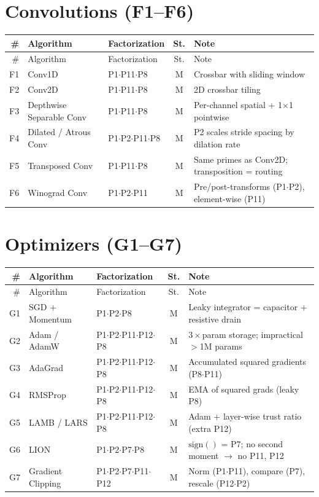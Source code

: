\documentclass[10pt]{article}
\begin{document}
\section{Convolutions (F1--F6)}

\begin{longtable}{rlp{3.0cm}cp{4.8cm}}
\toprule
\# & Algorithm & Factorization & St. & Note \\
\midrule
\endfirsthead
\toprule
\# & Algorithm & Factorization & St. & Note \\
\midrule
\endhead
\bottomrule
\endfoot
F1 & Conv1D & P1$\cdot$P11$\cdot$P8 & M & Crossbar with sliding window \\
F2 & Conv2D & P1$\cdot$P11$\cdot$P8 & M & 2D crossbar tiling \\
F3 & Depthwise Separable Conv & P1$\cdot$P11$\cdot$P8 & M & Per-channel spatial + 1$\times$1 pointwise \\
F4 & Dilated / Atrous Conv & P1$\cdot$P2$\cdot$P11$\cdot$P8 & M & P2 scales stride spacing by dilation rate \\
F5 & Transposed Conv & P1$\cdot$P11$\cdot$P8 & M & Same primes as Conv2D; transposition = routing \\
F6 & Winograd Conv & P1$\cdot$P2$\cdot$P11 & M & Pre/post-transforms (P1$\cdot$P2), element-wise (P11) \\
\end{longtable}

\section{Optimizers (G1--G7)}

\begin{longtable}{rlp{3.0cm}cp{4.8cm}}
\toprule
\# & Algorithm & Factorization & St. & Note \\
\midrule
\endfirsthead
\toprule
\# & Algorithm & Factorization & St. & Note \\
\midrule
\endhead
\bottomrule
\endfoot
G1 & SGD + Momentum & P1$\cdot$P2$\cdot$P8 & M & Leaky integrator = capacitor + resistive drain \\
G2 & Adam / AdamW & P1$\cdot$P2$\cdot$P11$\cdot$P12$\cdot$P8 & M & $3\times$param storage; impractical $>$1M params \\
G3 & AdaGrad & P1$\cdot$P2$\cdot$P11$\cdot$P12$\cdot$P8 & M & Accumulated squared gradients (P8$\cdot$P11) \\
G4 & RMSProp & P1$\cdot$P2$\cdot$P11$\cdot$P12$\cdot$P8 & M & EMA of squared grads (leaky P8) \\
G5 & LAMB / LARS & P1$\cdot$P2$\cdot$P11$\cdot$P12$\cdot$P8 & M & Adam + layer-wise trust ratio (extra P12) \\
G6 & LION & P1$\cdot$P2$\cdot$P7$\cdot$P8 & M & $\mathrm{sign}()$ = P7; no second moment $\to$ no P11, P12 \\
G7 & Gradient Clipping & P1$\cdot$P2$\cdot$P7$\cdot$P11$\cdot$P12 & M & Norm (P1$\cdot$P11), compare (P7), rescale (P12$\cdot$P2) \\
\end{longtable}
\end{document}

